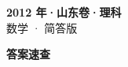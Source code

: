 \documentclass[zihao=-4, a4paper]{ctexart}
\begin{document}
\begin{center}
  {\Large\bfseries 2012 年·山东卷·理科}\\[4pt]
  {\large 数学 · 简答版}
\end{center}
\medskip
{}

\clearpage
{}
\begin{center}{\Large\bfseries 答案速查}\end{center}
\medskip

\end{document}
